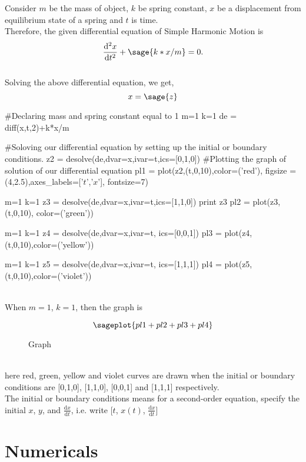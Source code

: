 \documentclass{report}
\begin{document}
Consider $m$ be the mass of object, $k$ be spring constant, $x$ be a displacement from equilibrium state of a spring and $t$ is time.\\
Therefore, the given differential equation of Simple Harmonic Motion is  
\[
  \frac{\mathrm{d}^{2}x}{\mathrm{d}t^{2}} +  \sage{k*x/m} = 0.
\]\\
Solving the above differential equation, we get,
$$x = \sage{z}$$
\begin{sagesilent}
#Declaring mass and spring constant equal to 1
m=1
k=1
de = diff(x,t,2)+k*x/m

#Soloving our differential equation by setting up the initial or boundary conditions.
z2 = desolve(de,dvar=x,ivar=t,ics=[0,1,0])
#Plotting the graph of solution of our differential equation
pl1 = plot(z2,(t,0,10),color=('red'), figsize = (4,2.5),axes_labels=['$t$','$x$'], fontsize=7)

m=1
k=1
z3 = desolve(de,dvar=x,ivar=t,ics=[1,1,0])
print z3
pl2 = plot(z3,(t,0,10), color=('green'))

m=1
k=1
z4 = desolve(de,dvar=x,ivar=t, ics=[0,0,1])
pl3 = plot(z4,(t,0,10),color=('yellow'))

m=1
k=1
z5 = desolve(de,dvar=x,ivar=t, ics=[1,1,1])
pl4 = plot(z5,(t,0,10),color=('violet'))
\end{sagesilent}\\
When $m=1$, $k=1$, then the graph is
\begin{figure}[h!]
$$\sageplot{pl1+pl2+pl3+pl4}$$
\caption{Graph}
\end{figure}\\
here red, green, yellow and violet curves are drawn when the initial or boundary conditions are [0,1,0], [1,1,0], [0,0,1] and [1,1,1] respectively.\\
The initial or boundary conditions means for a second-order equation, specify the initial $x$, $y$, and $\frac{\mathrm{d}x}{\mathrm{d}t}$, i.e. write [$t$, $x(t)$, $\frac{\mathrm{d}x}{\mathrm{d}t}$]

\section{Numericals}
\end{document}
